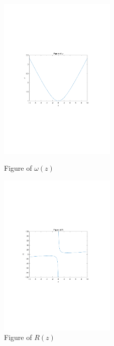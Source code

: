 \documentclass{article}
\begin{document}
\begin{figure}[h]
	\begin{minipage}[t]{0.5\linewidth}
		\centering
		\includegraphics[width=2.2in]{w.pdf}
		\caption{Figure of $\omega(z)$}
		\label{fig:side:a}
	\end{minipage}%
	\begin{minipage}[t]{0.5\linewidth}
		\centering
		\includegraphics[width=2.2in]{r.pdf}
		\caption{Figure of $R(z)$}
		\label{fig:side:b}
	\end{minipage}
\end{figure}
\end{document}
